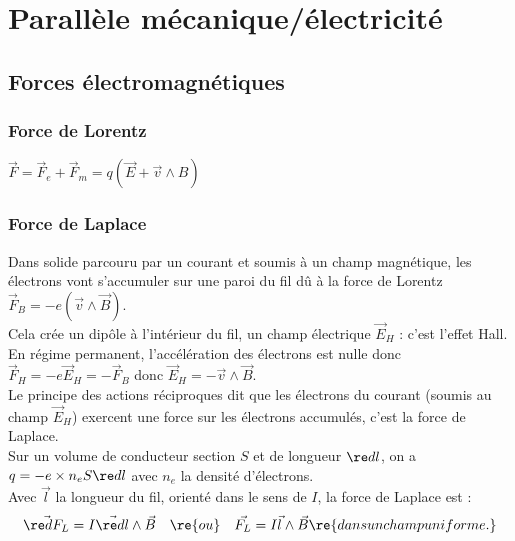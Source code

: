 \documentclass[13pt, twoside, a4paper, french]{report}
\begin{document}
\chapter{Parallèle mécanique/électricité}

    \section{Forces électromagnétiques}
    
        \subsection{Force de Lorentz}
        
            $\vec F = \vec F_e + \vec F_m = q (\vec E + \vec v \wedge B)$
            
        \subsection{Force de Laplace}

            Dans solide parcouru par un courant et soumis à un champ magnétique, les électrons vont s'accumuler sur une paroi du fil dû à la force de Lorentz $\vec F_B = -e (\vec v \wedge \vec B)$.\\
            
            Cela crée un dipôle à l'intérieur du fil, un champ électrique $\vec E_H$ : c'est l'effet Hall.\\
            En régime permanent, l'accélération des électrons est nulle donc $\vec F_H = -e \vec E_H = - \vec F_B$ donc $\vec E_H = - \vec v \wedge \vec B$.\\
            
            Le principe des actions réciproques dit que les électrons du courant (soumis au champ $\vec E_H$) exercent une force sur les électrons accumulés, c'est la force de Laplace.\\
            
            Sur un volume de conducteur section $S$ et de longueur $\re d l$, on a $q = -e \times n_e S \re d l$ avec $n_e$ la densité d'électrons.\\
            Avec $\vec l$ la longueur du fil, orienté dans le sens de $I$, la force de Laplace est :
            \[\vec{\re dF_L} = I \vec{\re dl} \wedge \vec B \quad \re{ou} \quad \vec{F_L} = I \vec l \wedge \vec B \re{ dans un champ uniforme.}\]
        
\end{document}
